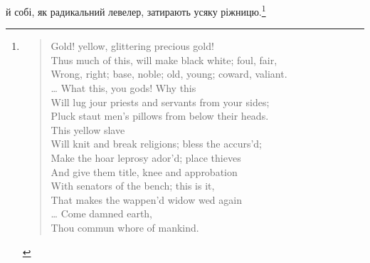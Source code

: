 й собі, як радикальний левелер, затирають усяку ріжницю.\footnote{
\begin{verse}
\vspace{-\dimexpr\baselineskip+\topsep}
Gold! yellow, glittering precious gold! \\
Thus much of this, will make black white; foul, fair, \\
Wrong, right; base, noble; old, young; coward, valiant. \\
\dots{} What this, you gods! Why this \\
Will lug jour priests and servants from your sides; \\
Pluck staut men’s pillows from below their heads. \\
This yellow slave \\
Will knit and break religions; bless the accurs'd; \\
Make the hoar leprosy ador’d; place thieves \\
And give them title, knee and approbation \\
With senators of the bench; this is it, \\
That makes the wappen’d widow wed again \\
\dots{} Come damned earth, \\
Thou commun whore of mankind. \\


\end{verse}}
